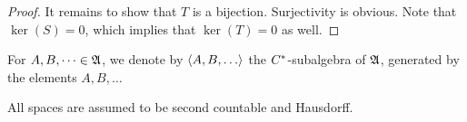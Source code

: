 \begin{proof}
 It remains to show that $T$ is a bijection.
 Surjectivity is obvious. Note that $\ker(S) =0$, which implies that 
 $\ker(T)=0$ as well.
 \end{proof}

For $A, B, \dots \in \mathfrak{A}$, we denote by $\gen{A, B, \dots}$ the
$C^{*}$-subalgebra of $\mathfrak{A}$, generated by the elements $A, B, \dots$

All spaces are assumed to be second countable and Hausdorff.



% 
% 

 
















